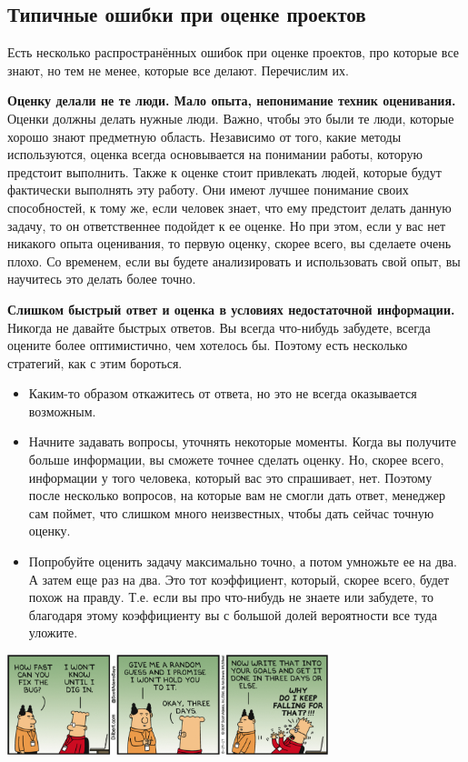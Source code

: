 \documentclass{../../text-style}
\begin{document}
\subsection{Типичные ошибки при оценке проектов}

Есть несколько распространённых ошибок при оценке проектов, про которые все знают, но тем не менее, которые все делают. Перечислим их.

\textbf{Оценку делали не те люди. Мало опыта, непонимание техник оценивания.} Оценки должны делать нужные люди. Важно, чтобы это были те люди, которые хорошо знают предметную область. Независимо от того, какие методы используются, оценка всегда основывается на понимании работы, которую предстоит выполнить. Также к оценке стоит привлекать людей, которые будут фактически выполнять эту работу. Они имеют лучшее понимание своих способностей, к тому же, если человек знает, что ему предстоит делать данную задачу, то он ответственнее подойдет к ее оценке. Но при этом, если у вас нет никакого опыта оценивания, то первую оценку, скорее всего, вы сделаете очень плохо. Со временем, если вы будете анализировать и использовать свой опыт, вы научитесь это делать более точно.

\textbf{Слишком быстрый ответ и оценка в условиях недостаточной информации.} Никогда не давайте быстрых ответов. Вы всегда что-нибудь забудете, всегда оцените более оптимистично, чем хотелось бы. Поэтому есть несколько стратегий, как с этим бороться.

\begin{itemize}
    \item Каким-то образом откажитесь от ответа, но это не всегда оказывается возможным.
    \item Начните задавать вопросы, уточнять некоторые моменты. Когда вы получите больше информации, вы сможете точнее сделать оценку. Но, скорее всего, информации у того человека, который вас это спрашивает, нет. Поэтому после несколько вопросов, на которые вам не смогли дать ответ, менеджер сам поймет, что слишком много неизвестных, чтобы дать сейчас точную оценку.
    \item Попробуйте оценить задачу максимально точно, а потом умножьте ее на два. А затем еще раз на два. Это тот коэффициент, который, скорее всего, будет похож на правду. Т.е. если вы про что-нибудь не знаете или забудете, то благодаря этому коэффициенту вы с большой долей вероятности все туда уложите.
\end{itemize}

\begin{center}
    \includegraphics[width=0.7\textwidth]{dilbertEstimation.png}
\end{center}
\end{document}
